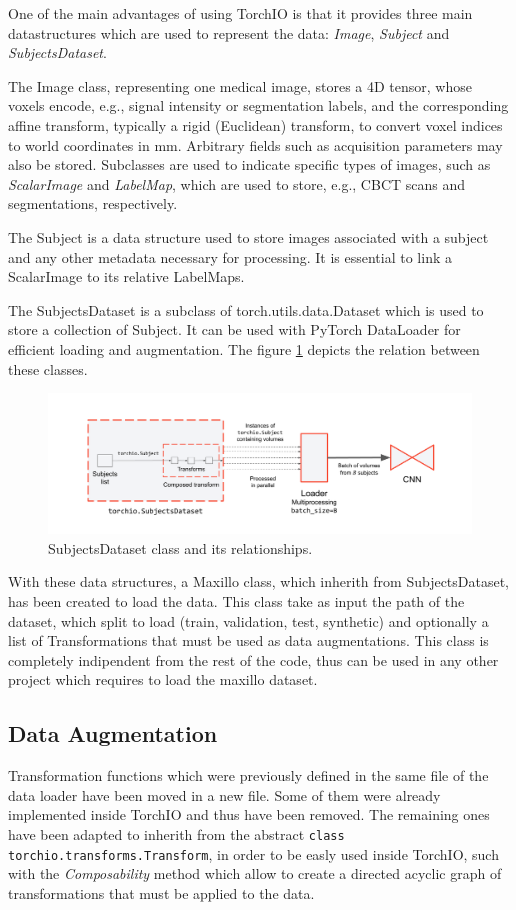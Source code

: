 One of the main advantages of using TorchIO is that it provides three main
datastructures which are used to represent the data: \emph{Image},
\emph{Subject} and \emph{SubjectsDataset}.

The Image class, representing one medical image, stores a 4D tensor, whose
voxels encode, e.g., signal intensity or segmentation labels, and the
corresponding affine transform, typically a rigid (Euclidean) transform, to
convert voxel indices to world coordinates in mm. Arbitrary fields such as
acquisition parameters may also be stored. Subclasses are used to indicate
specific types of images, such as \emph{ScalarImage} and \emph{LabelMap}, which
are used to store, e.g., CBCT scans and segmentations, respectively.

The Subject is a data structure used to store images associated with a subject
and any other metadata necessary for processing. It is essential to link a
ScalarImage to its relative LabelMaps.

The SubjectsDataset is a subclass of torch.utils.data.Dataset which is used to
store a collection of Subject. It can be used with PyTorch DataLoader for
efficient loading and augmentation. The figure \ref{fig:subjectsdataset}
depicts the relation between these classes.
\begin{figure}[h]
  \centering
  \includegraphics[width=0.9\linewidth]{Images/subjectsdataset.png}
  \caption{SubjectsDataset class and its relationships.}
  \label{fig:subjectsdataset}
\end{figure}
With these data structures, a Maxillo class, which inherith from
SubjectsDataset, has been created to load the data. This class take as input the
path of the dataset, which split to load (train, validation, test, synthetic)
and optionally a list of Transformations that must be used as data
augmentations. This class is completely indipendent from the rest of the code,
thus can be used in any other project which requires to load the maxillo
dataset.

\subsection{Data Augmentation}
Transformation functions which were previously defined in the same file of the
data loader have been moved in a new file. Some of them were already implemented
inside TorchIO and thus have been removed. The remaining ones have been adapted
to inherith from the abstract \texttt{class torchio.transforms.Transform}, in
order to be easly used inside TorchIO, such with the \emph{Composability} method
which allow to create a directed acyclic graph of transformations that must be
applied to the data.

